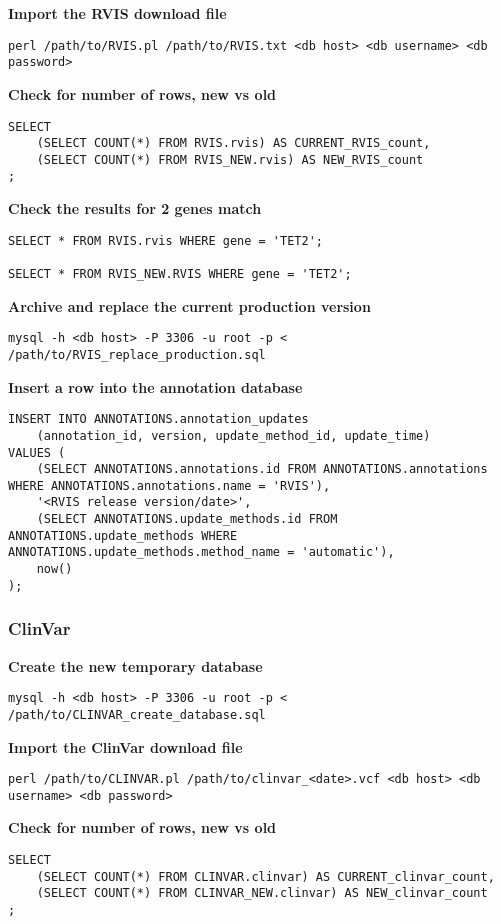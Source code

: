 \documentclass[11pt, a4paper]{article}
\begin{document}
\textbf{Import the RVIS download file}

\texttt{perl /path/to/RVIS.pl /path/to/RVIS.txt <db host> <db username> <db password>}

\textbf{Check for number of rows, new vs old}

\begin{lstlisting}
SELECT 
	(SELECT COUNT(*) FROM RVIS.rvis) AS CURRENT_RVIS_count,
	(SELECT COUNT(*) FROM RVIS_NEW.rvis) AS NEW_RVIS_count
;
\end{lstlisting}

\textbf{Check the results for 2 genes match}

\begin{lstlisting}
SELECT * FROM RVIS.rvis WHERE gene = 'TET2';

SELECT * FROM RVIS_NEW.RVIS WHERE gene = 'TET2';
\end{lstlisting}

\textbf{Archive and replace the current production version}

\texttt{mysql -h <db host> -P 3306 -u root -p < /path/to/RVIS\_replace\_production.sql}

\textbf{Insert a row into the annotation database}

\begin{lstlisting}
INSERT INTO ANNOTATIONS.annotation_updates 
	(annotation_id, version, update_method_id, update_time)
VALUES (
	(SELECT ANNOTATIONS.annotations.id FROM ANNOTATIONS.annotations WHERE ANNOTATIONS.annotations.name = 'RVIS'),
	'<RVIS release version/date>',
	(SELECT ANNOTATIONS.update_methods.id FROM ANNOTATIONS.update_methods WHERE ANNOTATIONS.update_methods.method_name = 'automatic'),
	now()
);
\end{lstlisting}

\subsubsection{ClinVar}

\textbf{Create the new temporary database}

\texttt{mysql -h <db host> -P 3306 -u root -p < /path/to/CLINVAR\_create\_database.sql}

\textbf{Import the ClinVar download file}

\texttt{perl /path/to/CLINVAR.pl /path/to/clinvar\_<date>.vcf <db host> <db username> <db password>}

\textbf{Check for number of rows, new vs old}

\begin{lstlisting}
SELECT 
	(SELECT COUNT(*) FROM CLINVAR.clinvar) AS CURRENT_clinvar_count,
	(SELECT COUNT(*) FROM CLINVAR_NEW.clinvar) AS NEW_clinvar_count
;
\end{lstlisting}
\end{document}
